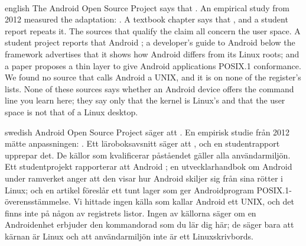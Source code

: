 \paragraph{} %
\begin{onlyin}{english} %
The Android Open Source Project says that
.
An empirical study from 2012 measured the adaptation:
.
A textbook chapter says that , and a student
report repeats it\autocite{Goel2021Android}.
The sources that qualify the claim all concern the user space.
A student project reports that Android
;
a developer's guide to Android below the framework advertises that it
shows how Android differs from its Linux roots\autocite{Yaghmour2013Embedded};
and a paper proposes a thin layer to give Android applications POSIX.1
conformance\autocite{Nafees2013POSIX}.
We found no source that calls Android a UNIX, and it is on none of the
register's lists.
None of these sources says whether an Android device offers the command
line you learn here; they say only that the kernel is Linux's and that
the user space is not that of a Linux desktop.
\end{onlyin}
\begin{onlyin}{swedish}
Android Open Source Project säger att
.
En empirisk studie från 2012 mätte anpassningen:
.
Ett läroboksavsnitt säger att
, och en studentrapport
upprepar det\autocite{Goel2021Android}.
De källor som kvalificerar påståendet gäller alla användarmiljön.
Ett studentprojekt rapporterar att Android
;
en utvecklarhandbok om Android under ramverket anger att den visar hur
Android skiljer sig från sina rötter i
Linux\autocite{Yaghmour2013Embedded};
och en artikel föreslår ett tunt lager som ger Androidprogram
POSIX.1-överensstämmelse\autocite{Nafees2013POSIX}.
Vi hittade ingen källa som kallar Android ett UNIX, och det finns inte
på någon av registrets listor.
Ingen av källorna säger om en Androidenhet erbjuder den kommandorad som
du lär dig här; de säger bara att kärnan är Linux och att
användarmiljön inte är ett Linuxskrivbords.
\end{onlyin}

